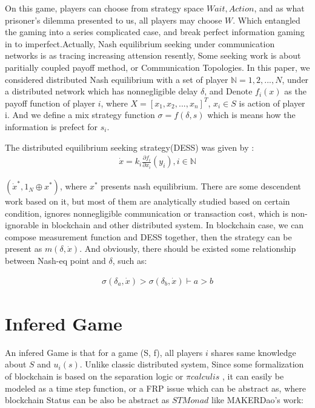 \documentclass[twocolumn]{article}
\begin{document}
On this game, players can choose from strategy space ${Wait, Action}$, and as what prisoner's dilemma presented to us, all players may choose $W$. Which entangled the gaming into a series complicated case, and break perfect information gaming in to imperfect.Actually, Nash equilibrium seeking under communication networks is as tracing increasing attension resently, Some seeking work is about paritially coupled payoff method\cite{8029164}, or Communication Topologies\cite{8093754}. In this paper, we considered distributed Nash equilibrium with a set of player $\mathbb{N} = {1, 2, ..., N}$, under a distributed network which has nonnegligible delay $\mathbb{\delta}$, and Denote $f_i(x)$ as the payoff function of player $i$, where $X = [x_1, x_2, ..., x_n]^T$, $x_i \in S$ is action of player i. And we define a mix strategy function $\sigma = f(\delta, s)$ which is means how the information is prefect for $s_i$.

The distributed equilibrium seeking strategy(DESS) was given by \cite{7888532}:
\begin{gather}
  \dot{x} = k_i \frac {\partial f_i}{\partial x_i}(y_i), i \in \mathbb{N}
\end{gather}

$(\dot{x}^*, 1_N\oplus x^*)$, where $x^*$ presents nash equilibrium. There are some descendent work based on it, but most of them are analytically studied based on certain condition, ignores nonnegligible communication or transaction cost, which is non-ignorable in blockchain and other distributed system. In blockchain case, we can compose measurement function and DESS together, then the strategy can be present as $m(\delta, \dot{x})$. And obviously, there should be existed some relationship between Nash-eq point and $\delta$, such as:

\begin{gather}
  \sigma(\delta_a, \dot{x}) > \sigma(\delta_b, \dot{x}) \vdash a > b
\end{gather}

\section{Infered Game}

An infered Game is that for a game (S, f), all players $i$ shares same knowledge about $S$ and $u_{i}(s)$.
Unlike classic distributed system,
Since some formalization of blockchain is based on the separation logic or $\pi calculis$ \cite{linearblockchain}, it can easily be modeled as a time step function, or a FRP issue which can be abstract as\cite{ElliottHudak97:Fran}, where blockchain Status can be also be abstract as $STMonad$ like MAKERDao\cite{dai}'s work:
\end{document}
